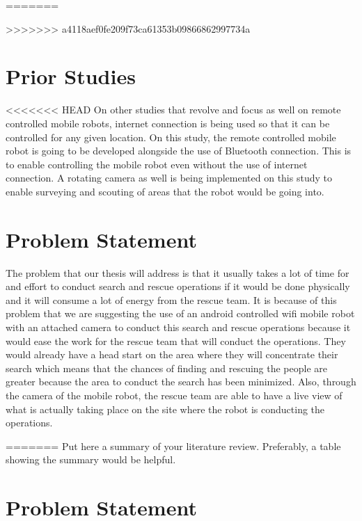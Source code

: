 =======

\Blindtext
>>>>>>> a4118aef0fe209f73ca61353b09866862997734a


\section{Prior Studies}

<<<<<<< HEAD
	On other studies that revolve and focus as well on remote controlled mobile robots, internet connection is being used so that it can be controlled for any given location. On this study, the remote controlled mobile robot is going to be developed alongside the use of Bluetooth connection. This is to enable controlling the mobile robot even without the use of internet connection. A rotating camera as well is being implemented on this study to enable surveying and scouting of areas that the robot would be going into. 
\blindtext


\section{Problem Statement}

	The problem that our thesis will address is that it usually takes a lot of time for and effort to conduct search and rescue operations if it would be done physically and it will consume a lot of energy from the rescue team. It is because of this problem that we are suggesting the use of an android controlled wifi mobile robot with an attached camera to conduct this search and rescue operations because it would ease the work for the rescue team that will conduct the operations. They would already have a head start on the area where they will concentrate their search which means that the chances of finding and rescuing the people are greater because the area to conduct the search has been minimized. Also, through the camera of the mobile robot, the rescue team are able to have a live view of what is actually taking place on the site where the robot is conducting the operations.
\blindtext


=======
Put here a summary of your literature review.  Preferably, a table showing the summary would be helpful. \blindtext



\section{Problem Statement}
\blindtext



